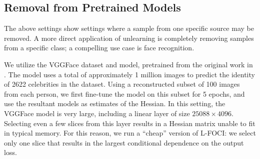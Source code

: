 \subsection{Removal from Pretrained Models}
The above settings show settings where a sample from one specific source may be removed. A more direct application of unlearning 
is completely removing samples from a specific class; a compelling use case is face recognition.

We utilize the VGGFace dataset and model, pretrained from the original work in \cite{huang2008labeled,Parkhi15}. The model uses a total of approximately 1 million images to predict the identity of 2622 celebrities in the dataset. Using a reconstructed subset of 100 images from each person, we first fine-tune the model on this subset for 5 epochs, and use the resultant models as estimates of the Hessian. 
In this setting, the VGGFace model is very large, including a linear layer of size $25088 \times 4096$. Selecting even a few slices from this layer results in a Hessian matrix unable to fit in typical memory. For this reason, we run a ``cheap'' version of L-FOCI: we select only one slice that results in the largest conditional dependence on the output loss.
%

